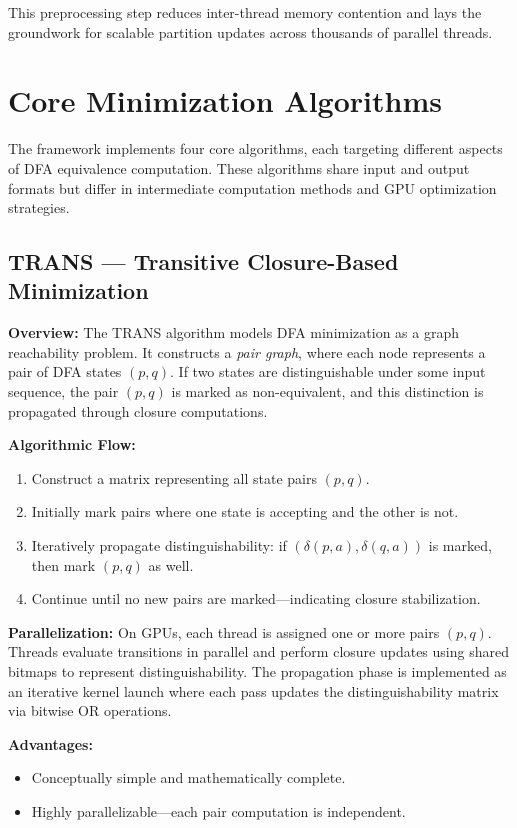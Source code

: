 This preprocessing step reduces inter-thread memory contention and lays the groundwork for scalable partition updates across thousands of parallel threads.

\section{Core Minimization Algorithms}

The framework implements four core algorithms, each targeting different aspects of DFA equivalence computation. These algorithms share input and output formats but differ in intermediate computation methods and GPU optimization strategies.

\subsection{TRANS — Transitive Closure-Based Minimization}

\textbf{Overview:}  
The TRANS algorithm models DFA minimization as a graph reachability problem. It constructs a \textit{pair graph}, where each node represents a pair of DFA states $(p, q)$. If two states are distinguishable under some input sequence, the pair $(p, q)$ is marked as non-equivalent, and this distinction is propagated through closure computations.

\textbf{Algorithmic Flow:}
\begin{enumerate}
    \item Construct a matrix representing all state pairs $(p, q)$.
    \item Initially mark pairs where one state is accepting and the other is not.
    \item Iteratively propagate distinguishability: if $(\delta(p,a), \delta(q,a))$ is marked, then mark $(p, q)$ as well.
    \item Continue until no new pairs are marked—indicating closure stabilization.
\end{enumerate}

\textbf{Parallelization:}  
On GPUs, each thread is assigned one or more pairs $(p, q)$. Threads evaluate transitions in parallel and perform closure updates using shared bitmaps to represent distinguishability. The propagation phase is implemented as an iterative kernel launch where each pass updates the distinguishability matrix via bitwise OR operations.  

\textbf{Advantages:}
\begin{itemize}
    \item Conceptually simple and mathematically complete.
    \item Highly parallelizable—each pair computation is independent.
\end{itemize}

